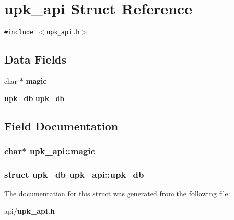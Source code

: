 \section{upk\_\-api Struct Reference}
\label{structupk__api}
{\tt \#include $<$upk\_\-api.h$>$}

\subsection*{Data Fields}
\begin{CompactItemize}
\item 
char $\ast$ \bf{magic}
\item 
\bf{upk\_\-db} \bf{upk\_\-db}
\end{CompactItemize}


\subsection{Field Documentation}
\subsubsection{\setlength{\rightskip}{0pt plus 5cm}char$\ast$ \bf{upk\_\-api::magic}}\label{structupk__api_fe5c84c41f2b702bd224f2db1a756c6d}


\subsubsection{\setlength{\rightskip}{0pt plus 5cm}struct \bf{upk\_\-db} \bf{upk\_\-api::upk\_\-db}}\label{structupk__api_4286b04bacaeec583dd52414ae7458dc}




The documentation for this struct was generated from the following file:\begin{CompactItemize}
\item 
api/\bf{upk\_\-api.h}\end{CompactItemize}
